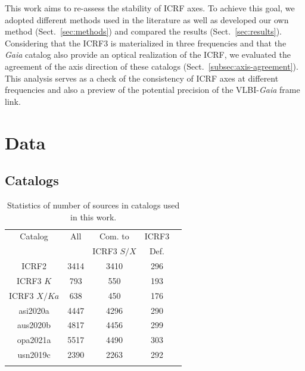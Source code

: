 \documentclass{aa}
\begin{document}
    This work aims to re-assess the stability of ICRF axes.
    To achieve this goal, we adopted different methods used in the literature as well as developed our own method (Sect.~\ref{sec:methods}) and compared the results (Sect.~\ref{sec:results}).
    Considering that the ICRF3 is materialized in three frequencies and that the \textit{Gaia} catalog also provide an optical realization of the ICRF, we evaluated the agreement of the axis direction of these catalogs (Sect.~\ref{subsec:axis-agreement}).
    This analysis serves as a check of the consistency of ICRF axes at different frequencies and also a preview of the potential precision of the VLBI-\textit{Gaia} frame link.



\section{Data}  \label{sec:data}


\subsection{Catalogs}  \label{subsec:catalogs}

\begin{table}
    \centering
    \caption[]{Statistics of number of sources in catalogs used in this work.}
    \label{tab:cat-stats}
    \begin{tabular}{ccccc}
        \hline
        \noalign{\smallskip}
        Catalog     &All    &Com. to        &ICRF3   \\
                    &       &ICRF3 $S/X$    & Def.   \\
        \noalign{\smallskip}
        \hline
        \noalign{\smallskip}
        ICRF2           &3414   &3410   &296 \\ 
        ICRF3 $K$       & 793   & 550   &193 \\
        ICRF3 $X/Ka$    & 638   & 450   &176 \\
        asi2020a        &4447   &4296   &290 \\
        aus2020b        &4817   &4456   &299 \\
        opa2021a        &5517   &4490   &303 \\
        usn2019c        &2390   &2263   &292 \\
        \noalign{\smallskip}
        \hline
    \end{tabular}
\end{table}
    
\end{document}
